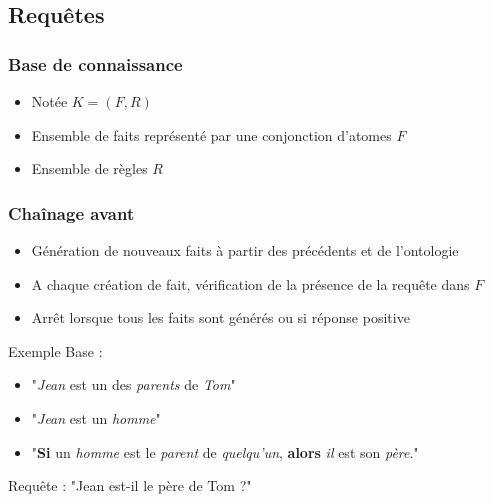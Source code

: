 
\subsection{Requêtes}

\begin{frame}
	\frametitle{Base de connaissance}
	\begin{itemize}
		\item Notée $K = (F,R)$
		\item Ensemble de faits représenté par une conjonction d'atomes $F$
		\item Ensemble de règles $R$
	\end{itemize}
\end{frame}

\begin{frame}
	\frametitle{Chaînage avant}
	\begin{itemize}
		\item Génération de nouveaux faits à partir des précédents et de l'ontologie
		\item A chaque création de fait, vérification de la présence de la requête dans
		$F$
		\item Arrêt lorsque tous les faits sont générés ou si réponse positive
	\end{itemize}
	\begin{exampleblock}{Exemple}
	Base :
	\begin{itemize}
		\item "{\em Jean} est un des {\em parents} de {\em Tom}"
		\item "{\em Jean} est un {\em homme}"
		\item "{\bf Si} un {\em homme} est le {\em parent} de {\em quelqu'un}, {\bf
		alors} {\em il} est son {\em père}."\\
	\end{itemize}
	Requête : "Jean est-il le père de Tom ?"\\
	\end{exampleblock}
\end{frame}

